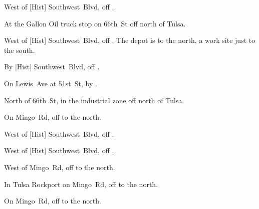 
\begin{LocationList}

\Location{\GarageHQ \Garage}
West of [Hist] Southwest~Blvd, off  .

At the Gallon Oil truck stop on 66th~St off  north of Tulsa.

West of [Hist] Southwest~Blvd, off  .
The depot is to the north, a work site just to the south.

By [Hist] Southwest~Blvd, off  .

On Lewis~Ave at 51st~St, by  .

North of 66th~St, in the industrial zone off  north of Tulsa.

On Mingo~Rd, off  to the north.

West of [Hist] Southwest~Blvd, off  .

\Location{\TruckService \Service}
West of [Hist] Southwest~Blvd, off  .

West of Mingo~Rd, off  to the north.

In Tulsa Rockport on Mingo~Rd, off  to the north.

On Mingo~Rd, off  to the north.

\end{LocationList}
